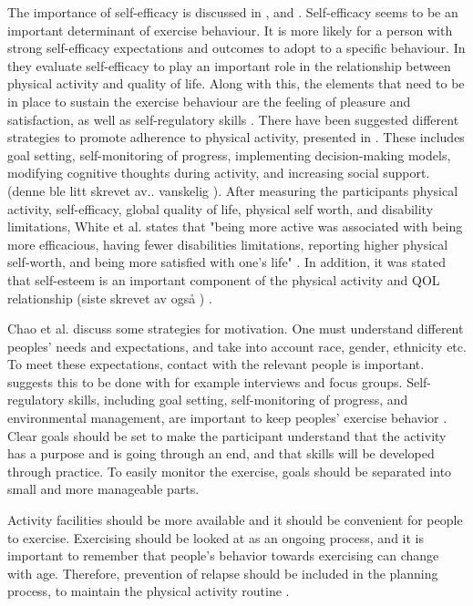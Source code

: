 The importance of self-efficacy is discussed in \cite{schutzer}, \cite{chao} and \cite{white}. Self-efficacy seems to be an important determinant of exercise behaviour. It is more likely for a person with strong self-efficacy expectations and outcomes to adopt to a specific behaviour. In \cite{white} they evaluate self-efficacy to play an important role in the relationship between physical activity and quality of life. Along with this, the elements that need to be in place to sustain  the exercise behaviour are the feeling of pleasure and satisfaction, as well as self-regulatory skills \cite{schutzer}. There have been suggested different strategies to promote adherence to physical activity, presented in \cite{chao}. These includes goal setting, self-monitoring of progress, implementing decision-making models, modifying cognitive thoughts during activity, and increasing social support. (denne ble litt skrevet av.. vanskelig \cite{chao}). After measuring the participants physical activity, self-efficacy, global quality of life, physical self worth, and disability limitations, White et al. states that "being more active was associated with being more efficacious, having fewer disabilities limitations, reporting higher physical self-worth, and being more satisfied with one's life" \cite{white}. In addition, it was stated that self-esteem is an important component of the physical activity and QOL relationship (siste skrevet av også ) \cite{white}. 

Chao et al. \cite{chao} discuss some strategies for motivation.  One must understand different peoples' needs and expectations, and take into account race, gender, ethnicity etc.  To meet these expectations, contact with the relevant people is important. \cite{chao} suggests this to be done with for example interviews and focus groups.  Self-regulatory skills, including goal setting, self-monitoring of progress, and environmental management, are important to keep peoples' exercise behavior \cite{chao}. Clear goals should be set to make the participant understand that the activity has a purpose and is going through an end, and that skills will be developed through practice. To easily monitor the exercise, goals should be separated into small and more manageable parts. 

Activity facilities should be more available and it should be convenient for people to exercise. Exercising should be looked at as an ongoing process, and it is important to remember that people's behavior towards exercising can change with age. Therefore, prevention of relapse should be included in the planning process, to maintain the physical activity routine \cite{chao}. 

